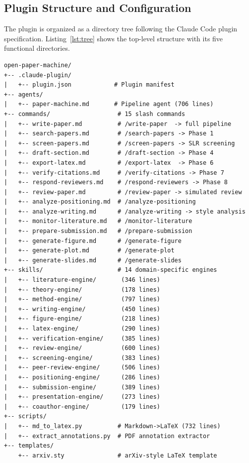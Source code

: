 \documentclass{article}
\begin{document}
\subsection{Plugin Structure and Configuration}

The plugin is organized as a directory tree following the Claude Code plugin specification. Listing~\ref{lst:tree} shows the top-level structure with its five functional directories.

\begin{lstlisting}[caption={Directory structure of the Open Academic Paper Machine plugin (v5.5.0). The system comprises 14 skill engines, 15 slash commands, 1 pipeline agent, 2 utility scripts, and 1 \LaTeX\ template.},label={lst:tree},float=t]
open-paper-machine/
+-- .claude-plugin/
|   +-- plugin.json            # Plugin manifest
+-- agents/
|   +-- paper-machine.md       # Pipeline agent (706 lines)
+-- commands/                   # 15 slash commands
|   +-- write-paper.md          # /write-paper  -> full pipeline
|   +-- search-papers.md        # /search-papers -> Phase 1
|   +-- screen-papers.md        # /screen-papers -> SLR screening
|   +-- draft-section.md        # /draft-section -> Phase 4
|   +-- export-latex.md         # /export-latex  -> Phase 6
|   +-- verify-citations.md     # /verify-citations -> Phase 7
|   +-- respond-reviewers.md    # /respond-reviewers -> Phase 8
|   +-- review-paper.md         # /review-paper -> simulated review
|   +-- analyze-positioning.md  # /analyze-positioning
|   +-- analyze-writing.md      # /analyze-writing -> style analysis
|   +-- monitor-literature.md   # /monitor-literature
|   +-- prepare-submission.md   # /prepare-submission
|   +-- generate-figure.md      # /generate-figure
|   +-- generate-plot.md        # /generate-plot
|   +-- generate-slides.md      # /generate-slides
+-- skills/                     # 14 domain-specific engines
|   +-- literature-engine/       (346 lines)
|   +-- theory-engine/           (178 lines)
|   +-- method-engine/           (797 lines)
|   +-- writing-engine/          (450 lines)
|   +-- figure-engine/           (218 lines)
|   +-- latex-engine/            (290 lines)
|   +-- verification-engine/     (385 lines)
|   +-- review-engine/           (600 lines)
|   +-- screening-engine/        (383 lines)
|   +-- peer-review-engine/      (506 lines)
|   +-- positioning-engine/      (286 lines)
|   +-- submission-engine/       (389 lines)
|   +-- presentation-engine/     (273 lines)
|   +-- coauthor-engine/         (179 lines)
+-- scripts/
|   +-- md_to_latex.py          # Markdown->LaTeX (732 lines)
|   +-- extract_annotations.py  # PDF annotation extractor
+-- templates/
    +-- arxiv.sty               # arXiv-style LaTeX template
\end{lstlisting}
\end{document}
